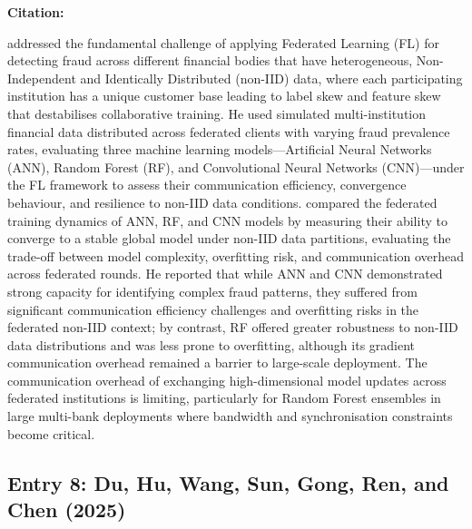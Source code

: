 \documentclass[12pt, a4paper]{article}
\newenvironment{surveyentry}[1]{%
  \vspace{6pt}
  \noindent\textbf{\color{navyblue}#1}\par
  \vspace{2pt}
  \noindent\hspace{1em}%
  \begin{minipage}[t]{0.97\linewidth}
}{%
  \end{minipage}
  \vspace{10pt}
}
\begin{document}
\begin{surveyentry}{Citation: \cite{sun2025flfraud}}
\cite{sun2025flfraud} addressed the fundamental challenge of applying Federated Learning (FL) for detecting fraud across different financial bodies that have heterogeneous, Non-Independent and Identically Distributed (non-IID) data, where each participating institution has a unique customer base leading to label skew and feature skew that destabilises collaborative training. He used simulated multi-institution financial data distributed across federated clients with varying fraud prevalence rates, evaluating three machine learning models---Artificial Neural Networks (ANN), Random Forest (RF), and Convolutional Neural Networks (CNN)---under the FL framework to assess their communication efficiency, convergence behaviour, and resilience to non-IID data conditions. \cite{sun2025flfraud} compared the federated training dynamics of ANN, RF, and CNN models by measuring their ability to converge to a stable global model under non-IID data partitions, evaluating the trade-off between model complexity, overfitting risk, and communication overhead across federated rounds. He reported that while ANN and CNN demonstrated strong capacity for identifying complex fraud patterns, they suffered from significant communication efficiency challenges and overfitting risks in the federated non-IID context; by contrast, RF offered greater robustness to non-IID data distributions and was less prone to overfitting, although its gradient communication overhead remained a barrier to large-scale deployment. The communication overhead of exchanging high-dimensional model updates across federated institutions is limiting, particularly for Random Forest ensembles in large multi-bank deployments where bandwidth and synchronisation constraints become critical.
\end{surveyentry}

\subsection*{Entry 8: Du, Hu, Wang, Sun, Gong, Ren, and Chen (2025)}
\end{document}

